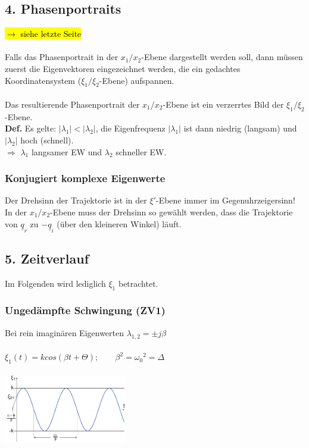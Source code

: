 \documentclass[a4paper,twocolumn,10pt]{article}
\begin{document}
\subsection*{4. Phasenportraits}
\hl{$\rightarrow$ siehe letzte Seite}\\\\
Falls das Phasenportrait in der $x_1/x_2$-Ebene dargestellt werden soll, dann müssen zuerst die Eigenvektoren eingezeichnet werden, die ein gedachtes Koordinatensystem ($\xi_1/\xi_2$-Ebene) aufspannen.\\\\
Das resultierende Phasenportrait der $x_1/x_2$-Ebene ist ein verzerrtes Bild der $\xi_1/\xi_2$-Ebene.\\
\textbf{Def.} Es gelte: $|\lambda_1| < |\lambda_2|$, die Eigenfrequenz $|\lambda_1|$ ist dann  niedrig (langsam) und $|\lambda_2|$ hoch (schnell). \\
$\Rightarrow$ $\lambda_1$ langsamer EW und $\lambda_2$  schneller EW.

\subsubsection*{Konjugiert komplexe Eigenwerte}
Der Drehsinn der Trajektorie ist in der $\xi'$-Ebene immer im Gegenuhrzeigersinn!\\
In der $x_1/x_2$-Ebene muss der Drehsinn so gewählt werden, dass die Trajektorie von $\underline{q}_r$ zu $-\underline{q}_i$ (über den kleineren Winkel) läuft.

\subsection*{5. Zeitverlauf}
Im Folgenden wird lediglich $\xi_1$ betrachtet.
\subsubsection*{Ungedämpfte Schwingung (ZV1)}
Bei rein imaginären Eigenwerten $\lambda_{1,2}=\pm j\beta$\\\\
$\xi_1(t)=k cos(\beta t+\Theta);\;\;\;\;\;\;\;\beta^2={\omega_0}^2=\Delta$\\\\
\includegraphics[width=0.4\textwidth]{img/Zustandsvariablen_Zeitverlauf1}
\end{document}

